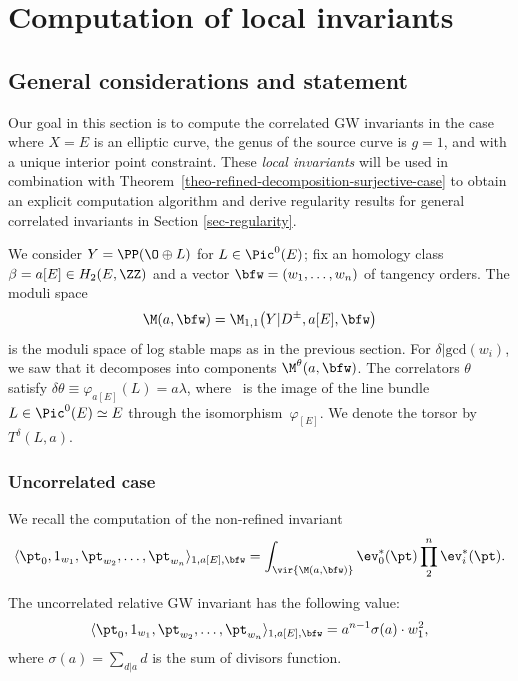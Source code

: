 \section{Computation of local invariants}
\label{sec-computation-local-invariants}

\subsection{General considerations and statement}

Our goal in this section is to compute the correlated GW invariants in the case where $X=E$ is an elliptic curve, the genus of the source curve is $g=1$, and with a unique interior point constraint. These \textit{local invariants} will be used in combination with Theorem~\ref{theo-refined-decomposition-surjective-case} to obtain an explicit computation algorithm and derive regularity results for general correlated invariants in Section \ref{sec-regularity}.

We consider $Y=\PP(\O\oplus L)$ for $L\in\Pic^0(E)$; fix an homology class $\beta=a[E]\in H_2(E,\ZZ)$ and a vector $\bfw=(w_1,\dots,w_n)$ of tangency orders. The moduli space
\[ \M(a,\bfw)=\M_{1,1}\bigl(Y|D^\pm,a[E],\bfw\bigr) \]
is the moduli space of log stable maps as in the previous section.
For $\delta|\mathrm{gcd}(w_i)$, we saw that it decomposes into components $\M^\theta(a,\bfw)$.
The correlators $\theta$ satisfy
$
\delta\theta\equiv \varphi_{a[E]}(L)=a\lambda$,
where~ is the image of the line bundle $L\in\Pic^0(E)\simeq E$ through the isomorphism~$\varphi_{[E]}$. We denote the torsor by $T^\delta(L,a)$.

\subsubsection{Uncorrelated case} We recall the computation of the non-refined invariant
\[ \langle \pt_0,1_{w_1},\pt_{w_2},\dots,\pt_{w_n}\rangle_{1,a[E],\bfw}=
\int_{\vir{\M(a,\bfw)}}\ev_0^*(\pt)\prod_2^n\ev_i^*(\pt). \]

\begin{lem}\label{lem-non-refined-computation}
The uncorrelated relative GW invariant has the following value:
\[ \langle \pt_0,1_{w_1},\pt_{w_2},\dots,\pt_{w_n}\rangle_{1,a[E],\bfw}=a^{n-1}\sigma(a)\cdot w_1^2, \]
where $\sigma(a)=\sum_{d|a}d$ is the sum of divisors function.
\end{lem}

